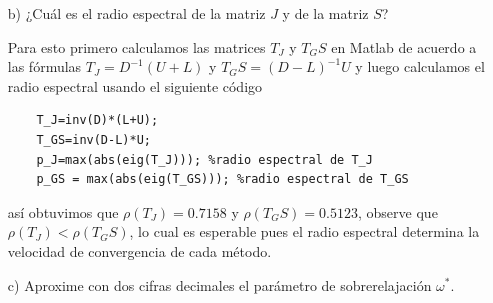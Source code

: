 \begin{enumerate}
    \item[b)] ¿Cuál es el radio espectral de la matriz $J$ y de la matriz $S$?

    \begin{solution}
        Para esto primero calculamos las matrices $T_J$ y $T_GS$ en Matlab de acuerdo a las fórmulas $T_J=D^{-1}(U+L)$ y $T_GS = (D-L)^{-1}U$ y luego calculamos el radio espectral usando el siguiente código
        \begin{lstlisting}
    T_J=inv(D)*(L+U); 
    T_GS=inv(D-L)*U;
    p_J=max(abs(eig(T_J))); %radio espectral de T_J
    p_GS = max(abs(eig(T_GS))); %radio espectral de T_GS
        \end{lstlisting}
        así obtuvimos que $\rho(T_J) = 0.7158$ y $\rho(T_GS) = 0.5123$, observe que $\rho(T_J) < \rho(T_GS)$, lo cual es esperable pues el radio espectral determina la velocidad de convergencia de cada método.
    \end{solution}

    \item[c)] Aproxime con dos cifras decimales el parámetro de sobrerelajación $\omega^*$.


\end{enumerate}
